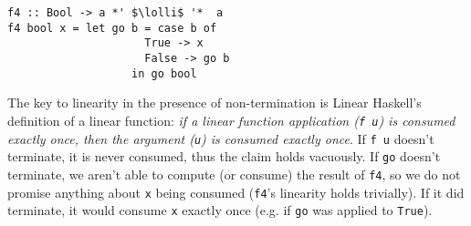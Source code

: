 \documentclass[acmsmall,review,screen]{acmart}
\newcommand{\incode}[1]{\lstinline{#1}}
\newcommand{\lolli}{\multimap}
\begin{document}
\begin{notyet}
\begin{lstlisting}
f4 :: Bool -> a *' $\lolli$ '*  a
f4 bool x = let go b = case b of
                     True -> x
                     False -> go b
                   in go bool
          \end{lstlisting}
        \end{notyet}

The key to linearity in the presence of non-termination is Linear Haskell's
definition of a linear function: \emph{if a linear function application (\incode{f u}) is
consumed exactly once, then the argument (\incode{u}) is consumed exactly once}.
If \incode{f u} doesn't terminate, it is never consumed, thus the claim holds
vacuously.
%
If \incode{go} doesn't terminate, we aren't able to compute (or consume) the result
of \incode{f4}, so we do not promise anything about \incode{x} being consumed (\incode{f4}'s
linearity holds trivially). If it did terminate, it would consume \incode{x} exactly
once (e.g. if \incode{go} was applied to \incode{True}).
\end{document}
